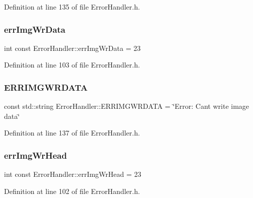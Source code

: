 Definition at line 135 of file Error\+Handler.\+h.

\mbox{\label{classErrorHandler_a5f37588aedcbd44ec5b33f16dd35a01e}} 
\subsubsection{\texorpdfstring{errImgWrData}{errImgWrData}}
{\footnotesize\ttfamily int const Error\+Handler\+::err\+Img\+Wr\+Data = 23\hspace{0.3cm}{\ttfamily [static]}}



Definition at line 103 of file Error\+Handler.\+h.

\mbox{\label{classErrorHandler_afc2c1377f8cee14dac495c98323b02f1}} 
\subsubsection{\texorpdfstring{ERRIMGWRDATA}{ERRIMGWRDATA}}
{\footnotesize\ttfamily const std\+::string Error\+Handler\+::\+E\+R\+R\+I\+M\+G\+W\+R\+D\+A\+TA = \char`\"{}Error\+: Can\textquotesingle{}t write image data\char`\"{}\hspace{0.3cm}{\ttfamily [static]}}



Definition at line 137 of file Error\+Handler.\+h.

\mbox{\label{classErrorHandler_a76194049ce9812eacb553724e5c1d78c}} 
\subsubsection{\texorpdfstring{errImgWrHead}{errImgWrHead}}
{\footnotesize\ttfamily int const Error\+Handler\+::err\+Img\+Wr\+Head = 23\hspace{0.3cm}{\ttfamily [static]}}



Definition at line 102 of file Error\+Handler.\+h.

